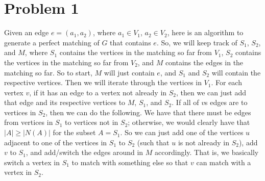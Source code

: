 \documentclass{article}
\begin{document}
\section*{Problem 1}
Given an edge $e = (a_1, a_2)$, where $a_1 \in V_1$, $a_2 \in V_2$,
here is an algorithm to generate a perfect matching of $G$
that contains $e$. So, we will keep track of $S_1$, $S_2$, and $M$, where $S_1$
contains the vertices in the matching so far from $V_1$, $S_2$ contains the
vertices in the matching so far from $V_2$, and $M$ contains the edges in the
matching so far. So to start, $M$ will just contain $e$, and $S_1$ and $S_2$
will contain the respective vertices. Then we will iterate
through the vertices in $V_1$. For each vertex $v$, if it has an edge to a
vertex not already in $S_2$, then we can just add that edge and its respective
vertices to $M$, $S_1$, and $S_2$. If all of $v$s edges are to vertices in $S_2$,
then we can do the following. We have that there must be edges from vertices in
$S_1$ to vertices not in $S_2$; otherwise, we would clearly have that
$|A| \geq |N(A)|$ for the subset $A = S_1$. So we can just add one of the
vertices $u$ adjacent to one of the vertices in $S_1$ to $S_2$ (such that $u$
is not already in $S_2$), add $v$ to $S_1$, and add/switch the edges around
in $M$ accordingly. That is, we basically switch a vertex in $S_1$ to match
with something else so that $v$ can match with a vertex in $S_2$.

\end{document}
